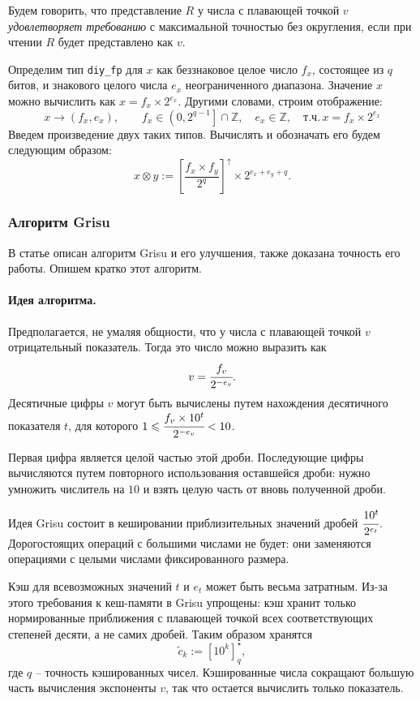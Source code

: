 Будем говорить, что представление $R$ у числа с плавающей точкой $v$ \textit{удовлетворяет требованию} с максимальной точностью без округления, если при чтении $R$ будет представлено как $v$.

Определим тип \texttt{diy\_fp} для $x$ как беззнаковое целое число $f_x$, состоящее из $q$ битов, и знакового целого числа $e_x$ неограниченного диапазона.
Значение $x$ можно вычислить как $x= f_x \times 2^{e_x}$. 
Другими словами, строим отображение:
$$x \to (f_x, e_x), \qquad f_x \in \left(0, 2^{q-1}\right] \cap \mathbb{Z}, \quad e_x \in \mathbb{Z},\quad \mbox{т.ч.}\, x=f_x \times 2^{e_x}$$
Введем произведение двух таких типов.
Вычислять и обозначать его будем следующим образом:
$$x \otimes y := \left[ \frac{f_x \times f_y}{2^q}\right]^\uparrow \times 2^{e_x+e_y+q}.$$
\subsubsection{Алгоритм \textsf{Grisu}}
В статье \cite{1} описан алгоритм \textsf{Grisu} и его улучшения, также доказана точность его работы.
Опишем кратко этот алгоритм.
\paragraph{Идея алгоритма.}
Предполагается, не умаляя общности, что у числа с плавающей точкой $v$ отрицательный показатель. 
Тогда это число можно выразить как $$v=\cfrac{f_v}{2^{-e_v}}.$$
Десятичные цифры $v$ могут быть вычислены путем нахождения десятичного показателя $t$, для которого $1 \leqslant \cfrac{f_v \times 10^t}{2^{-e_v}} < 10$.

Первая цифра является целой частью этой дроби. 
Последующие цифры вычисляются путем повторного использования оставшейся дроби: нужно умножить числитель на $10$ и взять целую часть от вновь полученной дроби.

Идея \textsf{Grisu} состоит в кешировании приблизительных значений дробей $\cfrac{10^t}{2^{e_t}}$.
Дорогостоящих операций с большими числами не будет: они заменяются операциями с целыми числами фиксированного размера.

Кэш для всевозможных значений $t$ и $e_t$ может быть весьма затратным. 
Из-за этого требования к кеш-памяти в \textsf{Grisu} упрощены: кэш хранит только нормированные приближения с плавающей точкой всех соответствующих степеней десяти, а не самих дробей. Таким образом хранятся $$\tilde{c}_k := \left[ 10^k \right]_q^{\star},$$ где $q$ -- точность кэшированных чисел.
Кэшированные числа сокращают большую часть вычисления экспоненты $v$, так что остается вычислить только показатель. 

